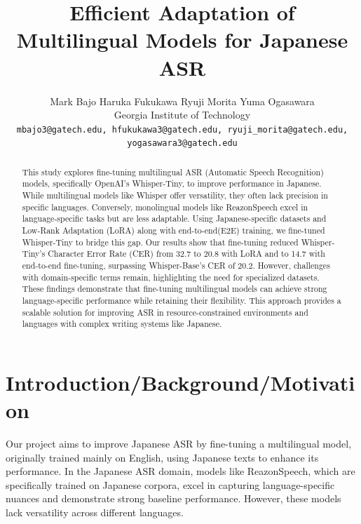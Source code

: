 \documentclass[10pt,twocolumn,letterpaper]{article}
\begin{document}
\title{Efficient Adaptation of Multilingual Models for Japanese ASR}

\author{
Mark Bajo \quad Haruka Fukukawa \quad Ryuji Morita \quad Yuma Ogasawara\\
Georgia Institute of Technology\\
\tt\small mbajo3@gatech.edu, hfukukawa3@gatech.edu, ryuji\_morita@gatech.edu, yogasawara3@gatech.edu\\
}

\maketitle

\begin{abstract}
This study explores fine-tuning multilingual ASR (Automatic Speech Recognition) models, specifically OpenAI’s Whisper-Tiny, to improve performance in Japanese. While multilingual models like Whisper offer versatility, they often lack precision in specific languages. Conversely, monolingual models like ReazonSpeech excel in language-specific tasks but are less adaptable. Using Japanese-specific datasets and Low-Rank Adaptation (LoRA) along with end-to-end(E2E) training, we fine-tuned Whisper-Tiny to bridge this gap. Our results show that fine-tuning reduced Whisper-Tiny’s Character Error Rate (CER) from 32.7 to 20.8 with LoRA and to 14.7 with end-to-end fine-tuning, surpassing Whisper-Base’s CER of 20.2. However, challenges with domain-specific terms remain, highlighting the need for specialized datasets. These findings demonstrate that fine-tuning multilingual models can achieve strong language-specific performance while retaining their flexibility. This approach provides a scalable solution for improving ASR in resource-constrained environments and languages with complex writing systems like Japanese.
\end{abstract}

\section{Introduction/Background/Motivation}

Our project aims to improve Japanese ASR by fine-tuning a multilingual model, originally trained mainly on English, using Japanese texts to enhance its performance. In the Japanese ASR domain, models like ReazonSpeech, which are specifically trained on Japanese corpora\cite{huggingfaceReazonspeechDatasets}, excel in capturing language-specific nuances and demonstrate strong baseline performance. However, these models lack versatility across different languages.
\end{document}
